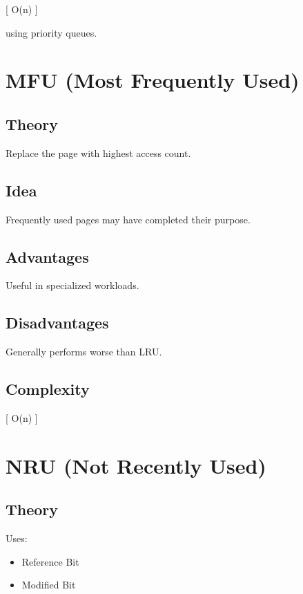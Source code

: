 [
O(\log n)
]

using priority queues.

\section{MFU (Most Frequently Used)}

\subsection{Theory}

Replace the page with highest access count.

\subsection{Idea}

Frequently used pages may have completed their purpose.

\subsection{Advantages}

Useful in specialized workloads.

\subsection{Disadvantages}

Generally performs worse than LRU.

\subsection{Complexity}

[
O(\log n)
]

\section{NRU (Not Recently Used)}

\subsection{Theory}

Uses:

\begin{itemize}
\item Reference Bit
\item Modified Bit
\end{itemize}

